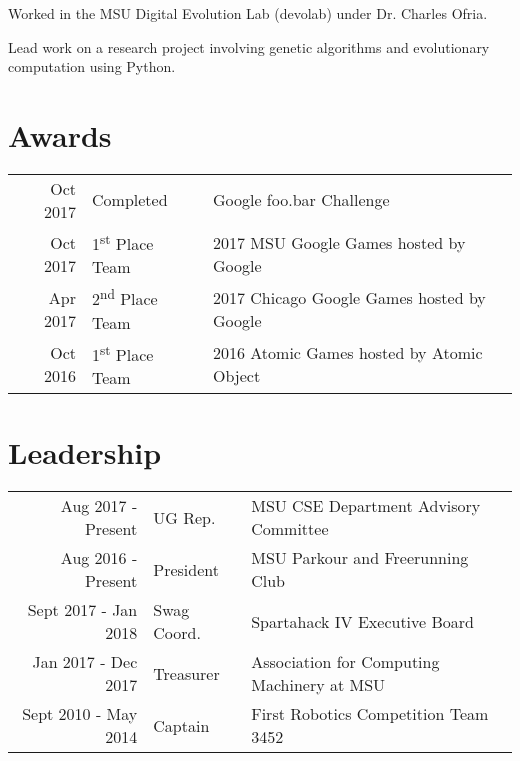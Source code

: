 \documentclass[]{deedy-resume-openfont}
\begin{document}
\begin{minipage}[t]{0.66\textwidth}
\begin{tightemize}
\item Worked in the MSU Digital Evolution Lab (devolab) under Dr. Charles Ofria.
\item Lead work on a research project involving genetic algorithms and evolutionary computation using Python.
\end{tightemize}
\sectionsep


\section{Awards}

\begin{tabular}{rll}
Oct 2017 & Completed & Google foo.bar Challenge\\
Oct 2017 & 1\textsuperscript{st} Place Team & 2017 MSU Google Games hosted by Google\\
Apr 2017 & 2\textsuperscript{nd} Place Team & 2017 Chicago Google Games hosted by Google\\
Oct 2016 & 1\textsuperscript{st} Place Team & 2016 Atomic Games hosted by Atomic Object\\
\end{tabular}
\sectionsep


\section{Leadership} 

\begin{tabular}{rll}
Aug 2017 - Present & UG Rep. & MSU CSE Department Advisory Committee\\
Aug 2016 - Present & President & MSU Parkour and Freerunning Club\\
Sept 2017 - Jan 2018 & Swag Coord. & Spartahack IV Executive Board\\
Jan 2017 - Dec 2017 & Treasurer & Association for Computing Machinery at MSU\\
Sept 2010 - May 2014 & Captain & First Robotics Competition Team 3452\\
\end{tabular}
\sectionsep


\end{minipage}
\end{document}
